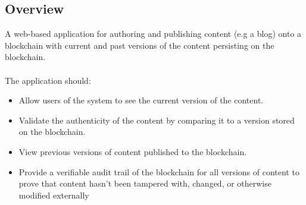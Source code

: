 \subsection{Overview}

A web-based application for authoring and publishing content (e.g a blog) onto a 
blockchain with current and past versions of the content persisting on the blockchain. 
\\ \\The application should: 
\begin{itemize}
    \item Allow users of the system to see the current version of the content.
    \item Validate the authenticity of the content by comparing it to a version stored on the blockchain.
    \item View previous versions of content published to the blockchain.
    \item Provide a verifiable audit trail of the blockchain for all versions of content to prove that content hasn’t been tampered with, 
          changed, or otherwise modified externally

\end{itemize}
